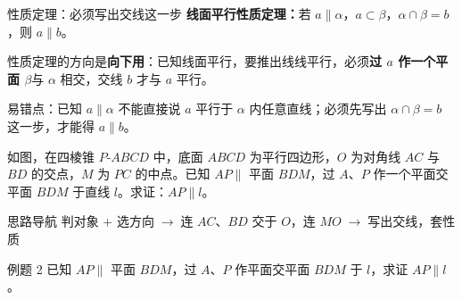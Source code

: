 \documentclass{exam-zh}
\begin{document}
\clearpage
{}


\begin{eduSolutionBox}{性质定理：必须写出交线这一步}
  \begingroup
  \setlength{\parskip}{2.5mm}
\textbf{线面平行性质定理：}若 $a\parallel\alpha$，$a\subset\beta$，$\alpha\cap\beta=b$，则 $a\parallel b$。\par
性质定理的方向是\textbf{向下用}：已知线面平行，要推出线线平行，必须\textbf{过 $a$ 作一个平面 $\beta$}与 $\alpha$ 相交，交线 $b$ 才与 $a$ 平行。\par
易错点：已知 $a\parallel\alpha$ 不能直接说 $a$ 平行于 $\alpha$ 内任意直线；必须先写出 $\alpha\cap\beta=b$ 这一步，才能得 $a\parallel b$。\par
  \endgroup
\end{eduSolutionBox}




\begin{eduProblemBlock}[例题 2]
\noindent
\begin{minipage}[t]{\dimexpr\linewidth-70mm-6mm\relax}
\vspace{0pt}
如图，在四棱锥 $P$-$ABCD$ 中，底面 $ABCD$ 为平行四边形，$O$ 为对角线 $AC$ 与 $BD$ 的交点，$M$ 为 $PC$ 的中点。已知 $AP\parallel$ 平面 $BDM$，过 $A$、$P$ 作一个平面交平面 $BDM$ 于直线 $l$。求证：$AP\parallel l$。

\end{minipage}\hfill
\begin{diagramcoltikz}{70mm}{四棱锥中观察 AP 与平面 BDM，已知线面平行要推线线平行。}
}
\end{diagramcoltikz}
\end{eduProblemBlock}





\begin{eduAuxItem}{思路导航}
判对象 + 选方向$\;\to\;$连 $AC$、$BD$ 交于 $O$，连 $MO$$\;\to\;$写出交线，套性质\end{eduAuxItem}




\begin{eduSubQuestionItem}{例题 2}
已知 $AP\parallel$ 平面 $BDM$，过 $A$、$P$ 作平面交平面 $BDM$ 于 $l$，求证 $AP\parallel l$。\end{eduSubQuestionItem}
\end{document}
